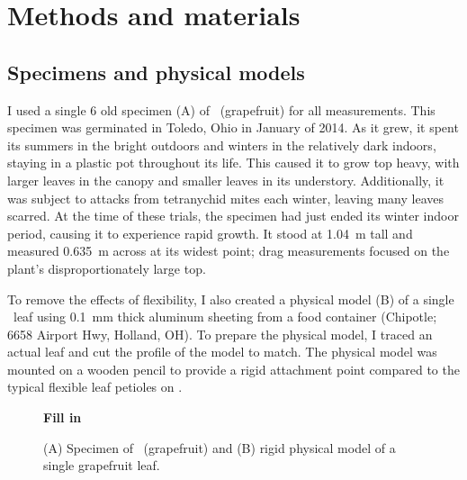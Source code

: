 \section{Methods and materials}
\label{sec:methods}

\subsection{Specimens and physical models}
I used a single \SI{6}{\year} old specimen (A) of \Citrusxparadisi\ (grapefruit) for all measurements. This specimen was germinated in Toledo, Ohio in January of 2014. As it grew, it spent its summers in the bright outdoors and winters in the relatively dark indoors, staying in a plastic pot throughout its life. This caused it to grow top heavy, with larger leaves in the canopy and smaller leaves in its understory. Additionally, it was subject to attacks from tetranychid mites each winter, leaving many leaves scarred. At the time of these trials, the specimen had just ended its winter indoor period, causing it to experience rapid growth. It stood at \SI{1.04}{\meter} tall and measured \SI{0.635}{\meter} across at its widest point; drag measurements focused on the plant's disproportionately large top.

To remove the effects of flexibility, I also created a physical model (B) of a single \Cxparadisi\ leaf using \SI{0.1}{\milli\meter} thick aluminum sheeting from a food container (Chipotle; 6658 Airport Hwy, Holland, OH). To prepare the physical model, I traced an actual leaf and cut the profile of the model to match. The physical model was mounted on a wooden pencil to provide a rigid attachment point compared to the typical flexible leaf petioles on \Cxparadisi. 
\begin{figure}
\begin{center}
\textbf{Fill in}
\end{center}
\caption{(A) Specimen of \Citrusxparadisi\ (grapefruit) and (B) rigid physical model of a single grapefruit leaf.}
\label{fig:methods:specimens}
\end{figure}








